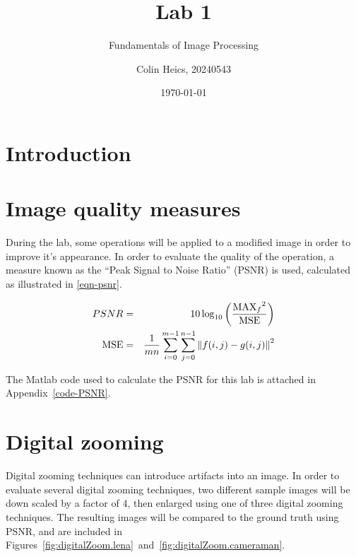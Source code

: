 \documentclass[article, 1.5space, letterpaper, 12pt, oneside, header, footer]{SydeClass}
\title{Lab 1}
\subtitle{Fundamentals of Image Processing}
\author{Colin Heics, 20240543}
\date{\today}
\begin{document}



\section{Introduction}



\section{Image quality measures}

During the lab, some operations will be applied to a modified image in order to improve it's appearance. In order to evaluate the quality of the operation, a measure known as the ``Peak Signal to Noise Ratio'' (PSNR) is used, calculated as illustrated in \eqref{eqn-psnr}.

\begin{eqnarray}
\label{eqn-psnr}
PSNR & = & 10 \log_{10}\left ( \frac{{\textup{MAX}_f}^{2}}{\textup{MSE}} \right ) \\
\textup{MSE} & = &\frac{1}{mn} \sum_{i=0}^{m-1}\sum_{j=0}^{n-1} \left \| f(i,j) - g(i,j) \right \|^2
\end{eqnarray}

The Matlab code used to calculate the PSNR for this lab is attached in Appendix~\ref{code-PSNR}.


\section{Digital zooming}

Digital zooming techniques can introduce artifacts into an image. In order to evaluate several digital zooming techniques, two different sample images will be down scaled by a factor of 4, then enlarged using one of three digital zooming techniques. The resulting images will be compared to the ground truth using PSNR, and are included in Figures~\ref{fig:digitalZoom.lena}~and~\ref{fig:digitalZoom.cameraman}.
\end{document}
